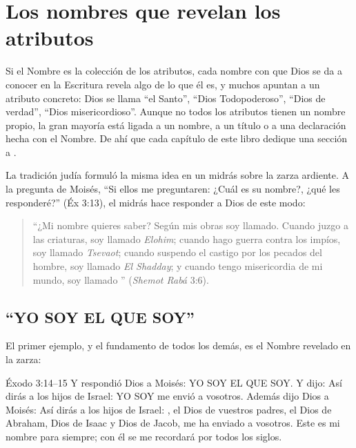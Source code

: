 \section{Los nombres que revelan los atributos}

Si el Nombre es la colección de los atributos, cada nombre con que Dios se da a conocer en la Escritura revela algo de lo que él es, y muchos apuntan a un atributo concreto: Dios se llama ``el Santo'', ``Dios Todopoderoso'', ``Dios de verdad'', ``Dios misericordioso''. Aunque no todos los atributos tienen un nombre propio, la gran mayoría está ligada a un nombre, a un título o a una declaración hecha con el Nombre. De ahí que cada capítulo de este libro dedique una sección a .

La tradición judía formuló la misma idea en un midrás sobre la zarza ardiente. A la pregunta de Moisés, ``Si ellos me preguntaren: ¿Cuál es su nombre?, ¿qué les responderé?'' (Éx 3:13), el midrás hace responder a Dios de este modo:

\begin{quote}\small
{}\par\smallskip
``¿Mi nombre quieres saber? Según mis obras soy llamado. Cuando juzgo a las criaturas, soy llamado \emph{Elohim}; cuando hago guerra contra los impíos, soy llamado \emph{Tsevaot}; cuando suspendo el castigo por los pecados del hombre, soy llamado \emph{El Shadday}; y cuando tengo misericordia de mi mundo, soy llamado \SENOR{}'' (\emph{Shemot Rabá} 3:6).
\end{quote}


\subsection{``YO SOY EL QUE SOY''}

El primer ejemplo, y el fundamento de todos los demás, es el Nombre revelado en la zarza:

\begin{verso}{Éxodo 3:14–15}
Y respondió Dios a Moisés: YO SOY EL QUE SOY. Y dijo: Así dirás a los hijos de Israel: YO SOY me envió a vosotros. Además dijo Dios a Moisés: Así dirás a los hijos de Israel: \SENOR{}, el Dios de vuestros padres, el Dios de Abraham, Dios de Isaac y Dios de Jacob, me ha enviado a vosotros. Este es mi nombre para siempre; con él se me recordará por todos los siglos.
\end{verso}

